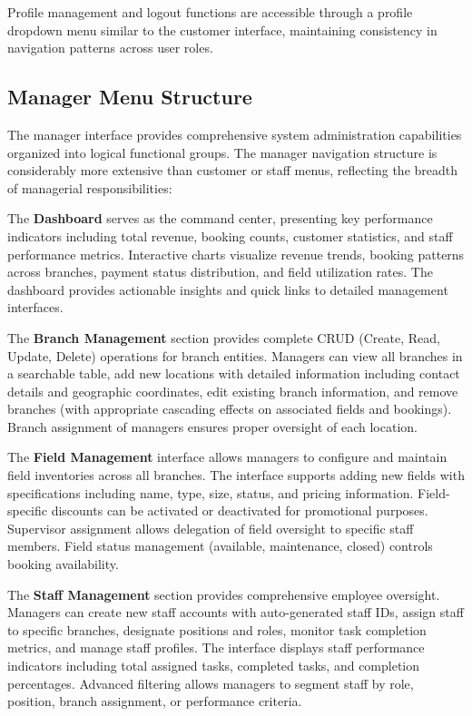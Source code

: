 Profile management and logout functions are accessible through a profile dropdown menu similar to the customer interface, maintaining consistency in navigation patterns across user roles.

\subsection{Manager Menu Structure}

The manager interface provides comprehensive system administration capabilities organized into logical functional groups. The manager navigation structure is considerably more extensive than customer or staff menus, reflecting the breadth of managerial responsibilities:

The \textbf{Dashboard} serves as the command center, presenting key performance indicators including total revenue, booking counts, customer statistics, and staff performance metrics. Interactive charts visualize revenue trends, booking patterns across branches, payment status distribution, and field utilization rates. The dashboard provides actionable insights and quick links to detailed management interfaces.

The \textbf{Branch Management} section provides complete CRUD (Create, Read, Update, Delete) operations for branch entities. Managers can view all branches in a searchable table, add new locations with detailed information including contact details and geographic coordinates, edit existing branch information, and remove branches (with appropriate cascading effects on associated fields and bookings). Branch assignment of managers ensures proper oversight of each location.

The \textbf{Field Management} interface allows managers to configure and maintain field inventories across all branches. The interface supports adding new fields with specifications including name, type, size, status, and pricing information. Field-specific discounts can be activated or deactivated for promotional purposes. Supervisor assignment allows delegation of field oversight to specific staff members. Field status management (available, maintenance, closed) controls booking availability.

The \textbf{Staff Management} section provides comprehensive employee oversight. Managers can create new staff accounts with auto-generated staff IDs, assign staff to specific branches, designate positions and roles, monitor task completion metrics, and manage staff profiles. The interface displays staff performance indicators including total assigned tasks, completed tasks, and completion percentages. Advanced filtering allows managers to segment staff by role, position, branch assignment, or performance criteria.


